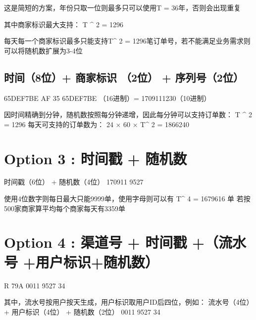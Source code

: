 \documentclass[12pt]{article}
\begin{document}
这是简短的方案，年份只取一位则最多只可以使用T = 36年，否则会出现重复

其中商家标识最大支持： T \^{} 2 = 1296

每天每一个商家标识最多只能支持T\^{} 2 = 1296笔订单号，若不能满足业务需求则可以将随机数扩展为3-4位

\subsection{时间（8位）+ 商家标识 （2位） + 序列号（2位）}\label{ux65f6ux95f48ux4f4d-ux5546ux5bb6ux6807ux8bc6-2ux4f4d-ux5e8fux5217ux53f72ux4f4d}

65DEF7BE AF 35 65DEF7BE （16进制）= 1709111230（10进制）

因时间精确到分钟，随机数按照每分钟递增，因此每分钟可以支持订单数： T \^{} 2 = 1296 每天可支持的订单数为： 24 × 60 × T\^{} 2 = 1866240

\section{Option 3 : 时间戳 + 随机数}\label{option-3-ux65f6ux95f4ux6233-ux968fux673aux6570}

时间戳（6位） + 随机数（4位） 170911 9527

使用4位数字则每日最大只能9999单，使用字母则可以有 T\^{} 4 = 1679616 单 若按500家商家算平均每个商家每天有3359单

\section{Option 4 : 渠道号 + 时间戳 +（流水号 +用户标识+随机数）}\label{option-4-ux6e20ux9053ux53f7-ux65f6ux95f4ux6233-ux6d41ux6c34ux53f7-ux7528ux6237ux6807ux8bc6ux968fux673aux6570}

R 79A 0011 9527 34

其中，流水号按用户按天生成，用户标识取用户ID后四位，例如： 流水号（4位） + 用户标识（4位） + 随机数（2位） 0011 9527 34
\end{document}
